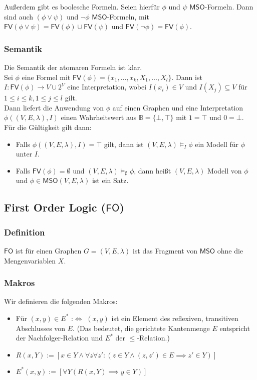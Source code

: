 \documentclass[12pt, german]{article}
\newcommand{\B}{\mathbb{B}}
\newcommand{\east}{E^{\ast}}
\newcommand{\fv}{\mathsf{FV}}
\newcommand{\fo}{\mathsf{FO}}
\newcommand{\mso}{\mathsf{MSO}}
\begin{document}
	Au\ss erdem gibt es boolesche Formeln. Seien hierfür $\phi$ und $\psi$ $\mso$-Formeln. Dann sind auch $(\phi \lor \psi)$ und $\neg \phi$ $\mso$-Formeln, 
	mit $\fv(\phi \lor \psi) = \fv(\phi) \cup \fv(\psi)$ und $\fv(\neg \phi) = \fv(\phi)$.

\subsubsection{Semantik}
	Die Semantik der atomaren Formeln ist klar.\\
	Sei $\phi$ eine Formel mit $\fv(\phi)=\{x_1,\ldots, x_k, X_1,\ldots, X_l\}$. Dann ist $I: \fv(\phi) \to V \cup 2^V$ eine Interpretation, wobei $I(x_i) \in V$ und $I(X_j) \subseteq V$ für $1\leq i\leq k, 1\leq j\leq l$ gilt. \\
	
	Dann liefert die Anwendung von $\phi$ auf einen Graphen und eine Interpretation $\phi((V,E,\lambda), I)$ einen Wahrheitswert aus $\B = \{\bot, \top\}$ mit $1 = \top$ und $0 = \bot$. \\
	Für die Gültigkeit gilt dann:
	\begin{itemize}
		\item 	Falls $\phi((V,E,\lambda), I) = \top$ gilt, dann ist $(V,E,\lambda) \models_I \phi$ ein Modell für $\phi$ unter $I$. 
		\item	Falls $\fv(\phi) = \emptyset$ und $(V,E,\lambda) \models_{\emptyset} \phi$, dann hei\ss t $(V,E,\lambda)$ Modell von $\phi$ und $\phi \in \mso(V,E,\lambda)$ ist ein Satz.
	\end{itemize}

\subsection{First Order Logic ($\fo$)}
\subsubsection{Definition}
	$\fo$ ist für einen Graphen $G=(V,E,\lambda)$ ist das Fragment von $\mso$ ohne die Mengenvariablen $X$.
	
\subsubsection{Makros}
	Wir definieren die folgenden Makros:
	\begin{itemize}
		\item  Für $(x,y) \in \east$ :$\iff$ $(x,y)$ ist ein Element des reflexiven, transitiven Abschlusses von $E$. (Das bedeutet, die gerichtete Kantenmenge $E$ entspricht der Nachfolger-Relation und $\east$ der $\leq$-Relation.)
		\item $R(x,Y) := [x \in Y \land \forall z \forall z': (z \in Y \land (z,z') \in E \implies z' \in Y)]$
		\item $\east(x,y) := [\forall Y (R(x,Y) \implies y \in Y)]$ 
	\end{itemize}
\end{document}
